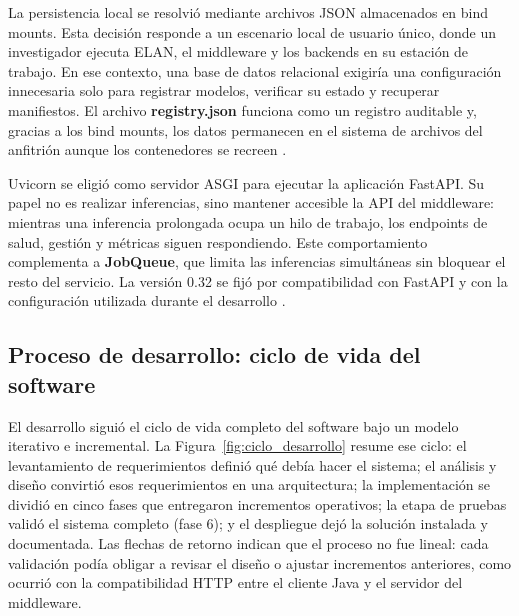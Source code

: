 La persistencia local se resolvió mediante archivos JSON almacenados en bind mounts. Esta decisión responde a un escenario local de usuario único, donde un investigador ejecuta ELAN, el middleware y los backends en su estación de trabajo. En ese contexto, una base de datos relacional exigiría una configuración innecesaria solo para registrar modelos, verificar su estado y recuperar manifiestos. El archivo \textbf{registry.json} funciona como un registro auditable y, gracias a los bind mounts, los datos permanecen en el sistema de archivos del anfitrión aunque los contenedores se recreen \cite{docker2026overview}.

Uvicorn se eligió como servidor ASGI para ejecutar la aplicación FastAPI. Su papel no es realizar inferencias, sino mantener accesible la API del middleware: mientras una inferencia prolongada ocupa un hilo de trabajo, los endpoints de salud, gestión y métricas siguen respondiendo. Este comportamiento complementa a \textbf{JobQueue}, que limita las inferencias simultáneas sin bloquear el resto del servicio. La versión 0.32 se fijó por compatibilidad con FastAPI y con la configuración utilizada durante el desarrollo \cite{uvicorn_docs}.
\vspace{1\baselineskip}

\subsection{Proceso de desarrollo: ciclo de vida del software}

El desarrollo siguió el ciclo de vida completo del software bajo un modelo iterativo e incremental. La Figura~\ref{fig:ciclo_desarrollo} resume ese ciclo: el levantamiento de requerimientos definió qué debía hacer el sistema; el análisis y diseño convirtió esos requerimientos en una arquitectura; la implementación se dividió en cinco fases que entregaron incrementos operativos; la etapa de pruebas validó el sistema completo (fase 6); y el despliegue dejó la solución instalada y documentada. Las flechas de retorno indican que el proceso no fue lineal: cada validación podía obligar a revisar el diseño o ajustar incrementos anteriores, como ocurrió con la compatibilidad HTTP entre el cliente Java y el servidor del middleware.

